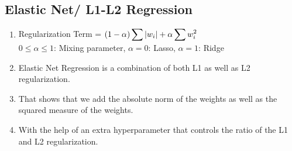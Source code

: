 \subsection{Elastic Net/ L1-L2 Regression}

\begin{enumerate}
    \item Regularization Term = $ (1-\alpha) \displaystyle\sum \left| w_i \right| + \alpha\displaystyle\sum w_i^2$
    \hfill \cite{geeksforgeeks/machine-learning/regularization-in-machine-learning}
    \\
    $0 \leq \alpha \leq 1$: Mixing parameter, $\alpha=0$: Lasso, $\alpha=1$: Ridge

    \item Elastic Net Regression is a combination of both L1 as well as L2 regularization. 
    \hfill \cite{geeksforgeeks/machine-learning/regularization-in-machine-learning}
    
    \item That shows that we add the absolute norm of the weights as well as the squared measure of the weights. 
    \hfill \cite{geeksforgeeks/machine-learning/regularization-in-machine-learning}
    
    \item With the help of an extra hyperparameter that controls the ratio of the L1 and L2 regularization.
    \hfill \cite{geeksforgeeks/machine-learning/regularization-in-machine-learning}
\end{enumerate}


























